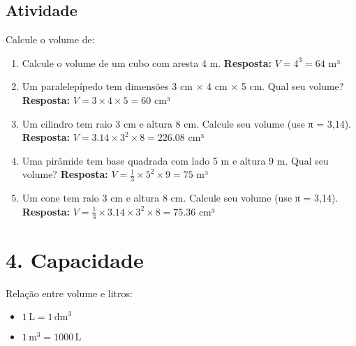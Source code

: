 \documentclass[11pt]{article}
\begin{document}
\begin{multicols}{2}
\begin{itemize}
\begin{center}
    \end{center}
\end{itemize}

\subsection*{Atividade}
Calcule o volume de:
\begin{enumerate}[label=\alph*)]
    \item Calcule o volume de um cubo com aresta 4 m.
    \textbf{Resposta:} $V = 4^3 = 64$ m³
    
    \item Um paralelepípedo tem dimensões 3 cm × 4 cm × 5 cm. Qual seu volume?
    \textbf{Resposta:} $V = 3 \times 4 \times 5 = 60$ cm³
    
    \item Um cilindro tem raio 3 cm e altura 8 cm. Calcule seu volume (use π = 3,14).
    \textbf{Resposta:} $V = 3.14 \times 3^2 \times 8 = 226.08$ cm³
    
    \item Uma pirâmide tem base quadrada com lado 5 m e altura 9 m. Qual seu volume?
    \textbf{Resposta:} $V = \frac{1}{3} \times 5^2 \times 9 = 75$ m³
    
    \item Um cone tem raio 3 cm e altura 8 cm. Calcule seu volume (use π = 3,14).
    \textbf{Resposta:} $V = \frac{1}{3} \times 3.14 \times 3^2 \times 8 = 75.36$ cm³
\end{enumerate}

\section*{4. Capacidade}
Relação entre volume e litros: 

\begin{itemize}
    \item $1 \, \text{L} = 1 \, \text{dm}^3$
    \item $1 \, \text{m}^3 = 1000 \, \text{L}$
\end{itemize}


\end{multicols}
\end{document}
